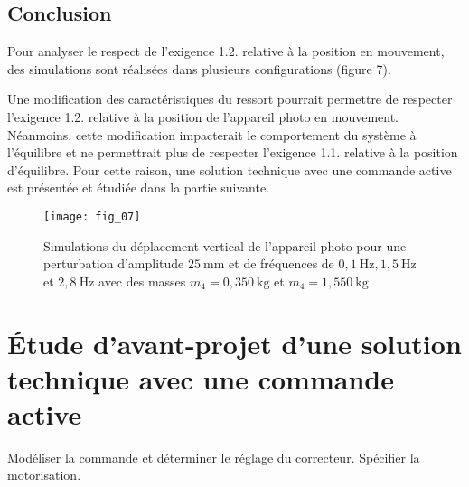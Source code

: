 \ifprof
\begin{corrige}
\end{corrige}
\else
\fi

\subsection{Conclusion}
Pour analyser le respect de l'exigence 1.2. relative à la position en mouvement, des simulations sont réalisées dans plusieurs configurations (figure 7).

\ifprof
\begin{corrige}
\end{corrige}
\else
\fi

Une modification des caractéristiques du ressort pourrait permettre de respecter l'exigence 1.2. relative à la position de l'appareil photo en mouvement. Néanmoins, cette modification impacterait le comportement du système à l'équilibre et ne permettrait plus de respecter l'exigence 1.1. relative à la position d'équilibre. Pour cette raison, une solution technique avec une commande active est présentée et étudiée dans la partie suivante.


\begin{figure}[H]
\centering
\texttt{[image: fig\_07]}
\caption{\label{fig:07} Simulations du déplacement vertical de l'appareil photo pour une perturbation d'amplitude $25 \mathrm{~mm}$ et de fréquences de $0,1 \mathrm{~Hz}, 1,5 \mathrm{~Hz}$ et $2,8 \mathrm{~Hz}$ avec des masses $m_{4}=0,350 \mathrm{~kg}$ et $m_{4}=1,550 \mathrm{~kg}$
}
\end{figure}



\section{\label{part:4} Étude d'avant-projet d'une solution technique avec une commande active }


\begin{obj}
Modéliser la commande et déterminer le réglage du correcteur. Spécifier la motorisation.
\end{obj}

